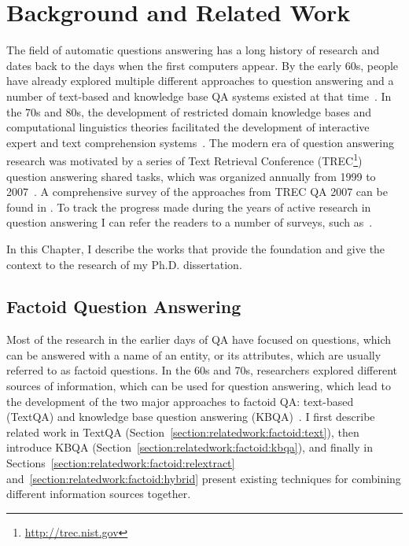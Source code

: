 \chapter{Background and Related Work}
\label{chapter:related}


The field of automatic questions answering has a long history of research and dates back to the days when the first computers appear.
By the early 60s, people have already explored multiple different approaches to question answering and a number of text-based and knowledge base QA systems existed at that time~\cite{Simmons:1965:AEQ:363707.363732,Simmons:1970:NLQ:361953.361963}.
In the 70s and 80s, the development of restricted domain knowledge bases and computational linguistics theories facilitated the development of interactive expert and text comprehension systems~\cite{androutsopoulos1995natural,shortliffe1975model,wilensky1988berkeley,woods1977lunar}.
The modern era of question answering research was motivated by a series of Text Retrieval Conference (TREC\footnote{\href{url}{http://trec.nist.gov}}) question answering shared tasks, which was organized annually from 1999 to 2007~\cite{voorhees2001trec}.
A comprehensive survey of the approaches from TREC QA 2007 can be found in \cite{dang2007overview}.
To track the progress made during the years of active research in question answering I can refer the readers to a number of surveys, such as~\cite{allam2012question,andrenucci2005automated,gupta2012survey,hirschman2001natural,Kolomiyets:2011:SQA:2046840.2047162,prager2006open,wang2006survey}.

In this Chapter, I describe the works that provide the foundation and give the context to the research of my Ph.D. dissertation.

\section{Factoid Question Answering}
\label{section:relatedwork:factoid}

Most of the research in the earlier days of QA have focused on questions, which can be answered with a name of an entity, or its attributes, which are usually referred to as factoid questions.
In the 60s and 70s, researchers explored different sources of information, which can be used for question answering, which lead to the development of the two major approaches to factoid QA: text-based (TextQA) and knowledge base question answering (KBQA)~\cite{Simmons:1965:AEQ:363707.363732}.
I first describe related work in TextQA (Section~\ref{section:relatedwork:factoid:text}), then introduce KBQA (Section~\ref{section:relatedwork:factoid:kbqa}), and finally in Sections~\ref{section:relatedwork:factoid:relextract} and~\ref{section:relatedwork:factoid:hybrid} present existing techniques for combining different information sources together.

